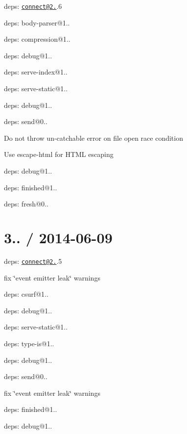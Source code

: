 {\ttfamily 
\begin{DoxyItemize}
\item deps\+: \href{mailto:connect@2.19}{\tt connect@2.}.6
\begin{DoxyItemize}
\item deps\+: body-\/parser@1..
\item deps\+: compression@1..
\item deps\+: debug@1..
\item deps\+: serve-\/index@1..
\item deps\+: serve-\/static@1..
\end{DoxyItemize}
\item deps\+: debug@1..
\item deps\+: send@0..
\begin{DoxyItemize}
\item Do not throw un-\/catchable error on file open race condition
\item Use {\ttfamily escape-\/html} for H\+T\+ML escaping
\item deps\+: debug@1..
\item deps\+: finished@1..
\item deps\+: fresh@0..
\end{DoxyItemize}
\end{DoxyItemize}}

{\ttfamily \section*{3.. / 2014-\/06-\/09 }}

{\ttfamily }

{\ttfamily 
\begin{DoxyItemize}
\item deps\+: \href{mailto:connect@2.19}{\tt connect@2.}.5
\begin{DoxyItemize}
\item fix \char`\"{}event emitter leak\char`\"{} warnings
\item deps\+: csurf@1..
\item deps\+: debug@1..
\item deps\+: serve-\/static@1..
\item deps\+: type-\/is@1..
\end{DoxyItemize}
\item deps\+: debug@1..
\item deps\+: send@0..
\begin{DoxyItemize}
\item fix \char`\"{}event emitter leak\char`\"{} warnings
\item deps\+: finished@1..
\item deps\+: debug@1..
\end{DoxyItemize}
\end{DoxyItemize}}


